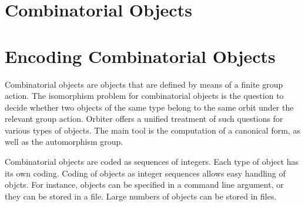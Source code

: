\bigskip


\section{Combinatorial Objects}
\label{sec:combinatorial:objects}



	

\bigskip


\clearpage

\section{Encoding Combinatorial Objects}
\label{sec:combinatorial:objects:files}



	

\bigskip


\clearpage

Combinatorial objects are objects that are defined by means of a finite group action.  
The isomorphism problem for combinatorial objects is the question 
to decide whether two objects of the same type belong to 
the same orbit under the relevant group action. 
Orbiter offers a unified treatment of such questions for various types of objects.
The main tool is the computation of a canonical form, as well as the automorphism group. 

\bigskip

Combinatorial objects are coded as sequences of integers.
Each type of object has its own coding. 
Coding of objects as integer sequences allows easy handling of objcts. 
For instance, objects can be specified in a command line argument, or they can be stored in a file.
Large numbers of objects can be stored in files.

\bigskip

